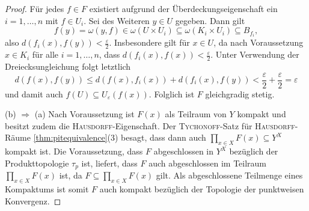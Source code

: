 \begin{proof}
  Für jedes $f \in F$ existiert aufgrund der Überdeckungseigenschaft ein $i = 1,\dots,n$ mit $f \in U_i$.
  Sei des Weiteren $y \in U$ gegeben.
  Dann gilt
  \begin{displaymath}
    f(y) = \omega(y,f) \in \omega(U \times U_i) \subseteq \omega(K_i \times U_i) \subseteq B_{f_i},
  \end{displaymath}
  also $d(f_i(x),f(y)) < \tfrac{\varepsilon}{2}$.
  Insbesondere gilt für $x \in U$, da nach Voraussetzung $x \in K_i$ für alle $i = 1,\dots,n$, dass $d(f_i(x),f(x)) < \tfrac{\varepsilon}{2}$.
  Unter Verwendung der Dreiecksungleichung folgt letztlich
  \begin{displaymath}
    d(f(x),f(y)) \leq d(f(x),f_i(x)) + d(f_i(x),f(y)) < \frac{\varepsilon}{2} + \frac{\varepsilon}{2} = \varepsilon
  \end{displaymath}
  und damit auch $f(U) \subseteq U_\varepsilon(f(x))$.
  Folglich ist $F$ gleichgradig stetig.

  (b) $\Rightarrow$ (a)
  Nach Voraussetzung ist $F(x)$ als Teilraum von $Y$ kompakt und besitzt zudem die \textsc{Hausdorff}-Eigenschaft.
  Der \textsc{Tychonoff}-Satz für \textsc{Hausdorff}-Räume \ref{thm:pitequivalence}(3) besagt, dass dann auch $\prod_{x \in X} F(x) \subseteq Y^X$ kompakt ist.
  Die Voraussetzung, dass $F$ abgeschlossen in $Y^X$ bezüglich der Produkttopologie $\tau_p$ ist, liefert, dass $F$ auch abgeschlossen im Teilraum $\prod_{x \in X} F(x)$ ist, da $F \subseteq \prod_{x \in X} F(x)$ gilt.
  Als abgeschlossene Teilmenge eines Kompaktums ist somit $F$ auch kompakt bezüglich der Topologie der punktweisen Konvergenz.


\end{proof}
